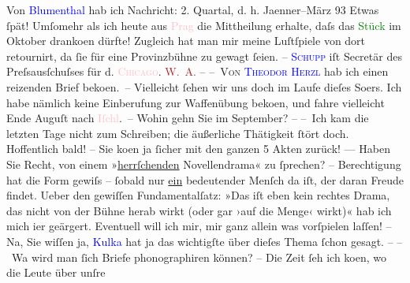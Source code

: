            \pstart
           Von \textcolor{blue}{Blumenthal}{}\ledrightnote{\textcolor{blue}{Oskar Blumenthal}} hab ich Nachricht: 2. Quartal,
                    d. h. Jaenner–März 93 Etwas ſpät! Umſomehr als ich
                    heute aus \textcolor{pink}{Prag}{}\ledrightnote{\textcolor{pink}{Prag}} die Mittheilung erhalte, daſs
                    das \textcolor{green}{Stück}{} im Oktober dranko{\geminationm}en dürfte! Zugleich hat man mir meine Luſtſpiele
                    von dort retournirt, da ſie für eine Provinzbühne zu gewagt ſeien.\pend
           \pstart
           {\pb}– \textcolor{blue}{\textsc{Schupp}}{}\ledrightnote{\textcolor{blue}{Falk Schupp}} iſt Secretär des Preſsausſchuſses für d. \textsc{\textcolor{pink}{Chicago}{}\ledrightnote{\textcolor{pink}{Chicago}}. \textcolor{brown}{W. A.}{}\ledrightnote{\textcolor{brown}{Weltausstellung 1893}}} –\pend
           \pstart
           – \textsc{Von \textcolor{blue}{Theodor Herzl}{}\ledrightnote{\textcolor{blue}{Theodor Herzl}}} hab ich einen reizenden Brief beko{\geminationm}en. –\pend
           \pstart
           Vielleicht ſehen wir uns doch im Laufe dieſes So{\geminationm}ers. Ich habe nämlich keine Einberufung zur Waffenübung beko{\geminationm}en, und fahre vielleicht Ende Auguſt
                    nach \textcolor{pink}{Iſchl}{}\ledrightnote{\textcolor{pink}{Bad Ischl}}. – Wohin gehn Sie im
                        September? –\pend
           \pstart
           – Ich kam die letzten Tage nicht zum Schreiben; die äußerliche Thätigkeit ſtört
                    doch. Hoffentlich bald! – Sie {\pb}ko{\geminationm}en ja ſicher mit den ganzen 5 Akten zurück!
                    ––\pend
           \pstart
           Haben Sie Recht, von einem »\uline{herrſchenden}
                    Novellendrama« zu ſprechen? – Berechtigung hat die Form gewiſs – ſobald nur \uline{ein} bedeutender Menſch da iſt, der daran Freude
                    findet. Ueber den gewiſſen Fundamentalſatz: »Das iſt eben kein rechtes Drama,
                    das nicht von der Bühne herab wirkt (oder gar ›auf die Menge‹ wirkt)« hab ich {\pb}mich
                        i{\geminationm}er geärgert. Eventuell will ich mir, mir ganz
                    allein was vorſpielen laſſen! – Na, Sie wiſſen ja, \textcolor{blue}{Kulka}{}\ledrightnote{\textcolor{blue}{Julius Kulka}} hat ja das wichtigſte über dieſes Thema ſchon gesagt.
                    –\pend
           \pstart
           – Wa{\geminationn} wird man ſich Briefe phonographiren können? –
                    Die Zeit ſeh ich ko{\geminationm}en, wo die Leute über unſre
